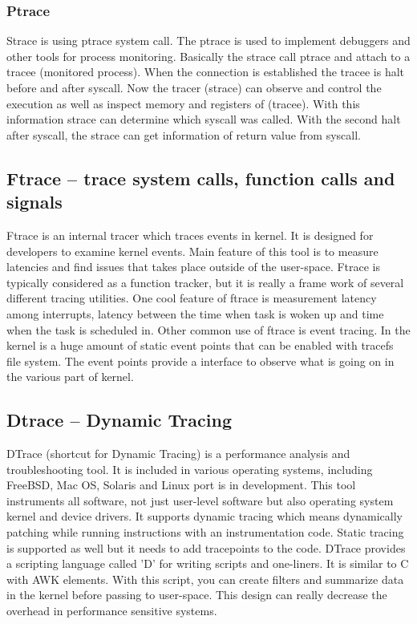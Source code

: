 \subsubsection{Ptrace}
Strace is using ptrace\cite{ptrace_man} system call.
The ptrace is used to  implement debuggers and other tools for process monitoring.
Basically the strace call ptrace and attach to a tracee (monitored process).
When the connection is established the tracee is halt before and after syscall.
Now the tracer (strace) can observe and control the execution as well as inspect memory and registers of (tracee).
With this information strace can determine which syscall was called.
With the second halt after syscall, the strace can get information of return value from syscall.

\subsection{Ftrace -- trace system calls, function calls and signals}
Ftrace\cite{ftrace_man} is an internal tracer which traces events in kernel.
It is designed for developers to examine kernel events. 
Main feature of this tool is to measure latencies and find issues that takes place outside of the user-space.
Ftrace is typically considered as a function tracker, but it is really a frame work of several different tracing utilities.
One cool feature of ftrace is measurement latency among interrupts, latency between the time when task is woken up and time when the task is scheduled in.
Other common use of ftrace is event tracing.
In the kernel is a huge amount of static event points that can be enabled with tracefs file system. 
The event points provide a interface to observe what is going on in the various part of kernel.

\subsection{Dtrace -- Dynamic Tracing}
DTrace\cite{dtrace_man}\cite{dtrace_about} (shortcut for Dynamic Tracing) is a performance analysis and troubleshooting tool.
It is included in various operating systems, including FreeBSD, Mac OS, Solaris and Linux port is in development.
This tool instruments all software, not just user-level software but also operating system kernel and device drivers.
It supports dynamic tracing which means dynamically patching while running instructions with an instrumentation code.
Static tracing is supported as well but it needs to add tracepoints to the code.
DTrace provides a scripting language called 'D' for writing scripts and one-liners.
It is similar to C with AWK elements.
With this script, you can create filters and summarize data in the kernel before passing to user-space.
This design can really decrease the overhead in performance sensitive systems.


